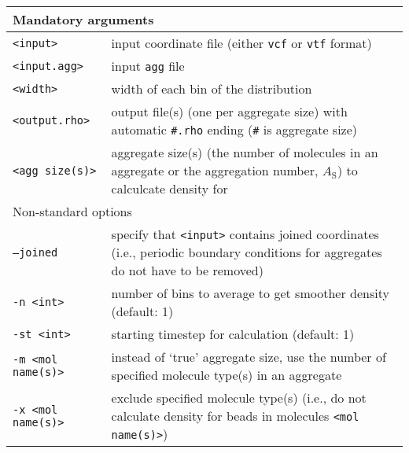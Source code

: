 \noindent
\begin{longtable}{p{}p{}}
  \toprule
  \multicolumn{2}{l}{Mandatory arguments} \\
  \midrule
  \texttt{<input>} & input coordinate file (either \texttt{vcf} or
    \texttt{vtf} format) \\
  \texttt{<input.agg>} & input \texttt{agg} file \\
  \texttt{<width>} & width of each bin of the distribution \\
  \texttt{<output.rho>} & output file(s) (one per aggregate size) with
    automatic \texttt{\#.rho} ending (\texttt{\#} is aggregate size) \\
  \texttt{<agg size(s)>} & aggregate size(s) (the number of molecules in an
    aggregate or the aggregation number, $A_{\mathrm{S}}$) to calculcate
    density for \\
  \toprule
  \multicolumn{2}{l}{Non-standard options} \\
  \midrule
  \texttt{--joined} & specify that \texttt{<input>} contains joined
    coordinates (i.e., periodic boundary conditions for aggregates do not
    have to be removed) \\
  \texttt{-n <int>} & number of bins to average to get smoother density
    (default: 1) \\
  \texttt{-st <int>} & starting timestep for calculation (default: 1) \\
  \texttt{-m <mol name(s)>} & instead of `true' aggregate size, use the number
    of specified molecule type(s) in an aggregate \\
  \texttt{-x <mol name(s)>} & exclude specified molecule type(s) (i.e., do
    not calculate density for beads in molecules \texttt{<mol name(s)>}) \\
  \bottomrule
\end{longtable}

